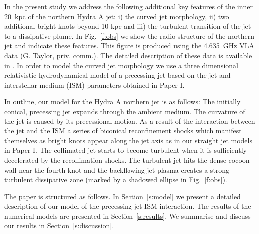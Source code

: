 \documentclass[useAMS, usenatbib]{mn2e}
\begin{document}
In the present study we address the following additional key features of the inner 20~kpc of the northern Hydra A jet: i) the curved jet morphology, ii) two additional bright knots beyond 10 kpc and iii) the turbulent transition of the jet to a dissipative plume. In Fig.~\ref{f:obs} we show the radio structure of the northern jet and indicate these features. This figure is produced using the 4.635~GHz VLA data (G. Taylor, priv. comm.). The detailed description of these data is available in \citet{taylor90}. In order to model the curved jet morphology we use a three dimensional relativistic hydrodynamical model of a precessing jet based on the jet and interstellar medium (ISM) parameters obtained in Paper I. 

In outline, our model for the Hydra A northern jet is as follows: The initially conical, precessing jet expands through the ambient medium. The curvature of the jet is caused by its precessional motion.
As a result of the interaction between the jet and the ISM a series of biconical reconfinement shocks which manifest themselves as bright knots appear along the jet axis as in our straight jet models in Paper I. The collimated jet starts to become turbulent when it is sufficiently decelerated by the recollimation shocks. The turbulent jet hits the dense cocoon wall near the fourth knot and the backflowing jet plasma creates a strong turbulent dissipative zone (marked by a shadowed ellipse in Fig.~\ref{f:obs}).
 

The paper is structured as follows. In Section~\ref{s:model} we present a detailed description of our model of the precessing jet-ISM interaction. The results of the numerical models are presented in Section~\ref{s:results}. We summarise and discuss our results in Section~\ref{s:discussion}. 


%
%
\end{document}
